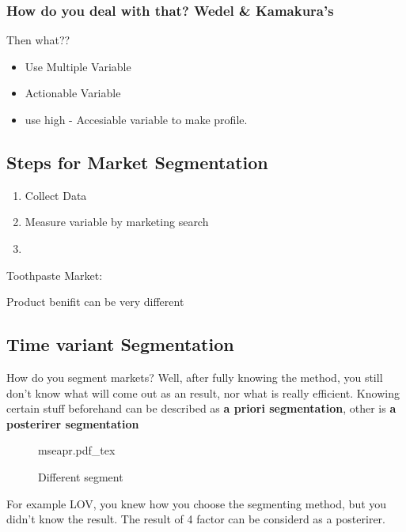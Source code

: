 \documentclass[12pt]{article}
\begin{document}
\subsubsection{How do you deal with that? Wedel \& Kamakura's}

%
%
%
%

{\large Then what??}

\begin{itemize}
	\item Use Multiple Variable
	\item Actionable Variable
	\item use high - Accesiable variable to make profile.
\end{itemize}

\subsection{Steps for Market Segmentation}

\begin{enumerate}
	\item Collect Data
	\item Measure variable by marketing search
	\item %
\end{enumerate}


	Toothpaste Market:

\begin{tcolorbox}
	Product benifit can be very different


\end{tcolorbox}

\subsection{Time variant Segmentation}

How do you segment markets? Well, after fully knowing the method, you still don't know what will come out as an result, nor what is really efficient.
Knowing certain stuff beforehand can be described as \textbf{a priori segmentation}, other is \textbf{a posterirer segmentation}
\begin{figure}[H]
	\centering
	\def\svgwidth{\columnwidth}
	{mseapr.pdf_tex}
	\caption{Different segment}
	\label{fig:mseapr}
\end{figure}
For example LOV, you knew how you choose the segmenting method, but you didn't know the result. The result of 4 factor can be considerd as a posterirer.
\end{document}
